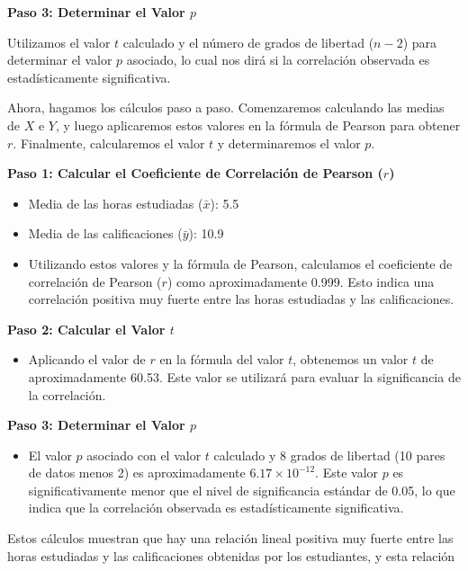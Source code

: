 \documentclass{article}
\begin{document}
\textbf{Paso 3: Determinar el Valor $p$}

Utilizamos el valor $t$ calculado y el número de grados de libertad ($n-2$) para determinar el valor $p$ asociado, lo cual nos dirá si la correlación observada es estadísticamente significativa.

Ahora, hagamos los cálculos paso a paso. Comenzaremos calculando las medias de $X$ e $Y$, y luego aplicaremos estos valores en la fórmula de Pearson para obtener $r$. Finalmente, calcularemos el valor $t$ y determinaremos el valor $p$.


\textbf{Paso 1: Calcular el Coeficiente de Correlación de Pearson ($r$)}

\begin{itemize}
    \item Media de las horas estudiadas ($\bar{x}$): 5.5
    \item Media de las calificaciones ($\bar{y}$): 10.9
    \item Utilizando estos valores y la fórmula de Pearson, calculamos el coeficiente de correlación de Pearson ($r$) como aproximadamente 0.999. Esto indica una correlación positiva muy fuerte entre las horas estudiadas y las calificaciones.
\end{itemize}

\textbf{Paso 2: Calcular el Valor $t$}

\begin{itemize}
    \item Aplicando el valor de $r$ en la fórmula del valor $t$, obtenemos un valor $t$ de aproximadamente 60.53. Este valor se utilizará para evaluar la significancia de la correlación.
\end{itemize}

\textbf{Paso 3: Determinar el Valor $p$}

\begin{itemize}
    \item El valor $p$ asociado con el valor $t$ calculado y 8 grados de libertad (10 pares de datos menos 2) es aproximadamente $6.17 \times 10^{-12}$. Este valor $p$ es significativamente menor que el nivel de significancia estándar de 0.05, lo que indica que la correlación observada es estadísticamente significativa.
\end{itemize}

Estos cálculos muestran que hay una relación lineal positiva muy fuerte entre las horas estudiadas y las calificaciones obtenidas por los estudiantes, y esta relación
\end{document}
